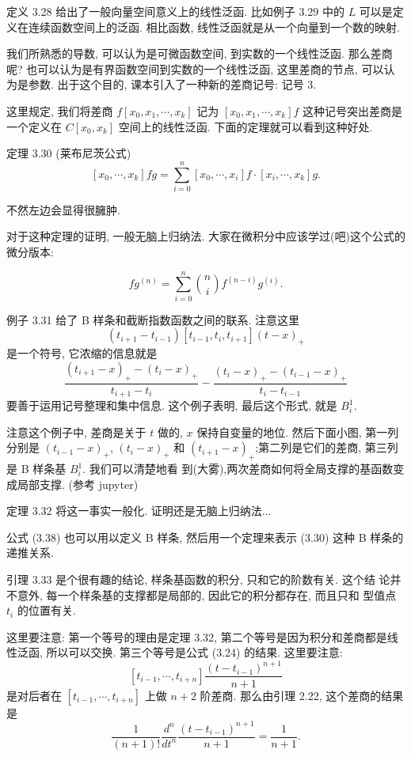 \documentclass[a4paper]{ctexart}
\begin{document}
定义 3.28 给出了一般向量空间意义上的线性泛函. 比如例子 3.29 中的 $L$
可以是定义在连续函数空间上的泛函. 相比函数, 线性泛函就是从一个向量到一个数的映射. 

我们所熟悉的导数, 可以认为是可微函数空间, 到实数的一个线性泛函. 那么差商呢? 
也可以认为是有界函数空间到实数的一个线性泛函, 这里差商的节点, 可以认为是参数. 
出于这个目的, 课本引入了一种新的差商记号: 记号 3. 

这里规定, 我们将差商 $f[x_0, x_1, \cdots, x_k]$ 记为 $[x_0, x_1,
  \cdots, x_k] f$ 这种记号突出差商是一个定义在 $C[x_0, x_k]$ 
空间上的线性泛函. 下面的定理就可以看到这种好处.

定理 3.30 (莱布尼茨公式)
$$
[x_0, \cdots, x_k] fg = \sum_{i = 0}^n [x_0, \cdots, x_i] f \cdot
[x_i, \cdots, x_k] g.
$$

不然左边会显得很臃肿.

对于这种定理的证明, 一般无脑上归纳法. 大家在微积分中应该学过(吧)这个公式的微分版本:

$$
fg^{(n)} = \sum_{i = 0}^n {n \choose i} f^{(n - i)}g^{(i)}.
$$

例子 3.31 给了 B 样条和截断指数函数之间的联系. 注意这里
$$
(t_{i + 1} - t_{i - 1})[t_{i - 1}, t_i, t_{i + 1}](t - x)_+
$$
是一个符号, 它浓缩的信息就是
$$
\frac{(t_{i + 1} - x)_+ - (t_i - x)_+}{t_{i + 1} - t_i} 
- \frac{(t_i - x)_+ - (t_{i - 1} - x)_+}{t_i - t_{i - 1}}
$$
要善于运用记号整理和集中信息. 这个例子表明, 最后这个形式, 就是 $B_i^1$. 

注意这个例子中, 差商是关于 $t$ 做的, $x$ 保持自变量的地位. 然后下面小图, 
第一列分别是 $(t_{i - 1} - x)_+$, $(t_i - x)_+$ 和 $(t_{i + 1} -
x)_+$;第二列是它们的差商, 第三列是 B 样条基 $B_i^1$. 我们可以清楚地看
到(大雾),两次差商如何将全局支撑的基函数变成局部支撑. (参考 jupyter)

定理 3.32 将这一事实一般化. 证明还是无脑上归纳法...

公式 (3.38) 也可以用以定义 B 样条, 然后用一个定理来表示 (3.30) 这种 B
样条的递推关系. 

引理 3.33 是个很有趣的结论, 样条基函数的积分, 只和它的阶数有关. 这个结
论并不意外, 每一个样条基的支撑都是局部的, 因此它的积分都存在, 而且只和
型值点 $t_i$ 的位置有关. 

这里要注意: 第一个等号的理由是定理 3.32, 第二个等号是因为积分和差商都是线性泛函, 
所以可以交换. 第三个等号是公式 (3.24) 的结果. 这里要注意:
$$
[t_{i - 1}, \cdots, t_{i + n}] \frac{(t - t_{i - 1})^{n + 1}}{n + 1}
$$
是对后者在 $[t_{i - 1}, \cdots, t_{i + n}]$ 上做 $n + 2$ 阶差商. 
那么由引理 2.22, 这个差商的结果是
$$
\frac{1}{(n + 1)!} \frac{d^n}{d t^n} \frac{(t - t_{i - 1})^{n + 1}}{n + 1} 
= \frac{1}{n + 1}.
$$
\end{document}
